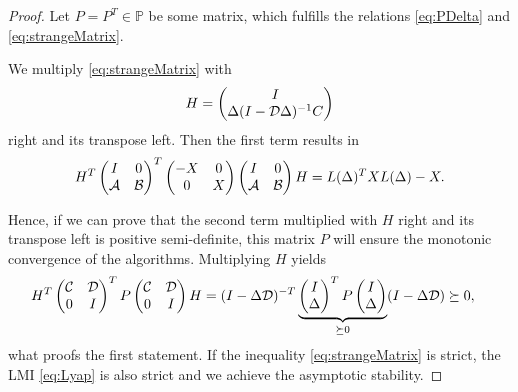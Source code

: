 \begin{proof}	
	Let $P = P^T \in \mathbb{P}$ be some matrix, which fulfills the relations \eqref{eq:PDelta} and \eqref{eq:strangeMatrix}.
	
	We multiply \eqref{eq:strangeMatrix} with 
	\begin{align}
		H = \begin{pmatrix}
			I \\ \Delta ( I - \mathcal{D} \Delta)^{-1}C
		\end{pmatrix}
	\end{align}	
right and its transpose left. Then the first term results in 
\begin{align}
H^T
\begin{pmatrix}
I & 0 \\ \mathcal{A} &  \mathcal{B}
\end{pmatrix}^T
\begin{pmatrix}
-X & 0 \\ 0 & X
\end{pmatrix} 
\begin{pmatrix}
I & 0 \\ \mathcal{A} &  \mathcal{B}
\end{pmatrix} H 
= L(\Delta)^T X L(\Delta) - X.
\end{align}
	
	Hence, if we can prove that the second term multiplied with $H$ right and its transpose left is positive semi-definite, this matrix $P$ will ensure the monotonic convergence of the algorithms. Multiplying $H$ yields 
	\begin{align*}
	&H^T\begin{pmatrix}
	\mathcal{C} & \mathcal{D} \\ 0 & I
	\end{pmatrix}^T
	P
	\begin{pmatrix}
	\mathcal{C} & \mathcal{D} \\ 0 & I
	\end{pmatrix} H  = 
	(I - \Delta \mathcal{D})^{-T} \underbrace{\begin{pmatrix}
		I \\ \Delta 
		\end{pmatrix}^T P
		\begin{pmatrix}
		I \\ \Delta 
		\end{pmatrix}}_{\succeq 0}(I - \Delta \mathcal{D})
	\succeq 0,
	\end{align*}
	what proofs the first statement. 
	If the inequality \eqref{eq:strangeMatrix} is strict, the LMI \eqref{eq:Lyap} is also strict and we achieve the asymptotic stability. 
\end{proof}



